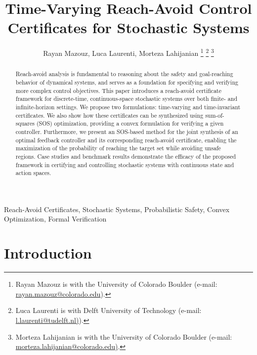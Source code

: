 \documentclass[journal,twoside,web]{ieeecolor}
\theoremstyle{definition}
\theoremstyle{plain}
\theoremstyle{plain}
\begin{document}
\title{Time-Varying Reach-Avoid Control Certificates for Stochastic Systems}
\author{Rayan Mazouz, Luca Laurenti, Morteza Lahijanian
\thanks{Rayan Mazouz is with the University of Colorado Boulder (e-mail: \href{mailto:rayan.mazouz@colorado.edu}{rayan.mazouz@colorado.edu}).}
\thanks{Luca Laurenti is with Delft University of Technology (e-mail:
\href{mailto:l.laurenti@tudelft.nl}{l.laurenti@tudelft.nl)}).}
\thanks{Morteza Lahijanian is with the University of Colorado Boulder (e-mail: 
\href{mailto:morteza.lahijanian@colorado.edu}{morteza.lahijanian@colorado.edu)}.}}

\maketitle

\begin{abstract}
Reach-avoid analysis is fundamental to reasoning about the safety and goal-reaching behavior of dynamical systems, and serves as a foundation for specifying and verifying more complex control objectives. This paper introduces a reach-avoid certificate framework for discrete-time, continuous-space stochastic systems over both finite- and infinite-horizon settings. We propose two formulations: time-varying and time-invariant certificates. We also show how these certificates can be synthesized using sum-of-squares (SOS) optimization, providing a convex formulation for verifying a given controller. Furthermore, we present an SOS-based method for the joint synthesis of an optimal feedback controller and its corresponding reach-avoid certificate, enabling the maximization of the probability of reaching the target set while avoiding unsafe regions. Case studies and benchmark results demonstrate the efficacy of the proposed framework in certifying and controlling stochastic systems with continuous state and action spaces.
\end{abstract}

\begin{IEEEkeywords}
Reach-Avoid Certificates, Stochastic Systems, Probabilistic Safety, Convex Optimization, Formal Verification
\end{IEEEkeywords}


\section{Introduction}
\end{document}
